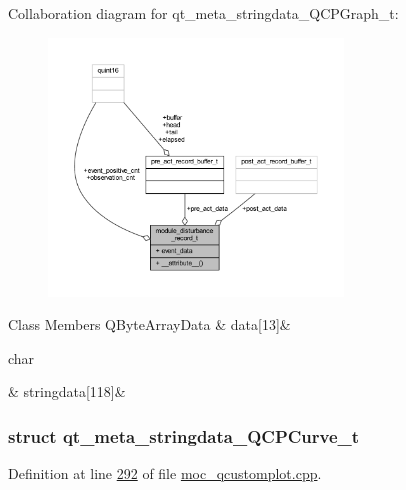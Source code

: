 Collaboration diagram for qt\+\_\+meta\+\_\+stringdata\+\_\+\+Q\+C\+P\+Graph\+\_\+t\+:
\nopagebreak
\begin{figure}[H]
\begin{center}
\leavevmode
\includegraphics[width=222pt]{da/dd4/a00291}
\end{center}
\end{figure}
\begin{DoxyFields}{Class Members}
\hypertarget{a00067_a52173b02d8396dce2aa3a046123398ea}{Q\+Byte\+Array\+Data}\label{a00067_a52173b02d8396dce2aa3a046123398ea}
&
data\mbox{[}13\mbox{]}&
\\
\hline

\hypertarget{a00067_a8d599799df5356cb10dc7a790a0e26a2}{char}\label{a00067_a8d599799df5356cb10dc7a790a0e26a2}
&
stringdata\mbox{[}118\mbox{]}&
\\
\hline

\end{DoxyFields}
\label{d3/d2a/a00195}
\hypertarget{a00067_d3/d2a/a00195}{}
\subsubsection{struct qt\+\_\+meta\+\_\+stringdata\+\_\+\+Q\+C\+P\+Curve\+\_\+t}


Definition at line \hyperlink{a00067_source_l00292}{292} of file \hyperlink{a00067_source}{moc\+\_\+qcustomplot.\+cpp}.



